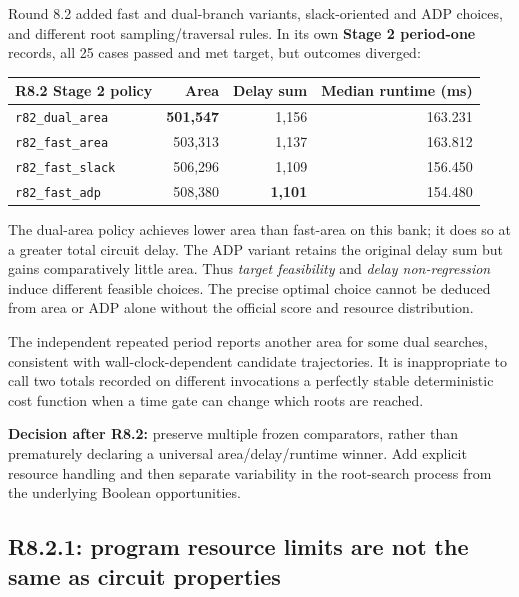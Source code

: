 Round 8.2 added fast and dual-branch variants, slack-oriented and ADP choices, and different root sampling/traversal rules. In its own \textbf{Stage 2 period-one} records, all 25 cases passed and met target, but outcomes diverged:

\begin{longtable}[]{@{}lrrr@{}}
\toprule\noalign{}
R8.2 Stage 2 policy & Area & Delay sum & Median runtime (ms) \\
\midrule\noalign{}
\endhead
\bottomrule\noalign{}
\endlastfoot
\texttt{r82\_dual\_area} & \textbf{501,547} & 1,156 & 163.231 \\
\texttt{r82\_fast\_area} & 503,313 & 1,137 & 163.812 \\
\texttt{r82\_fast\_slack} & 506,296 & 1,109 & 156.450 \\
\texttt{r82\_fast\_adp} & 508,380 & \textbf{1,101} & 154.480 \\
\end{longtable}

The dual-area policy achieves lower area than fast-area on this bank; it does so at a greater total circuit delay. The ADP variant retains the original delay sum but gains comparatively little area. Thus \emph{target feasibility} and \emph{delay non-regression} induce different feasible choices. The precise optimal choice cannot be deduced from area or ADP alone without the official score and resource distribution.

The independent repeated period reports another area for some dual searches, consistent with wall-clock-dependent candidate trajectories. It is inappropriate to call two totals recorded on different invocations a perfectly stable deterministic cost function when a time gate can change which roots are reached.

\begin{tcolorbox}[colback=ResearchBlue!6!white,colframe=ResearchSlate!55!white,boxrule=0.65pt,arc=1mm,breakable]
\textbf{Decision after R8.2:} preserve multiple frozen comparators, rather than prematurely declaring a universal area/delay/runtime winner. Add explicit resource handling and then separate variability in the root-search process from the underlying Boolean opportunities.
\end{tcolorbox}

\subsection{R8.2.1: program resource limits are not the same as circuit properties}\label{r8.2.1-program-resource-limits-are-not-the-same-as-circuit-properties}

